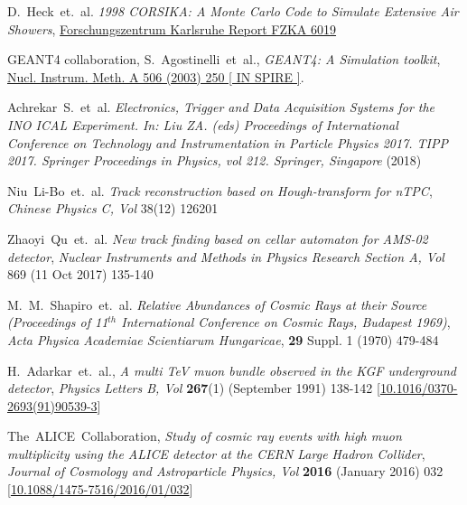 \documentclass[a4paper,12pt,twoside]{article}
\begin{document}
\begin{thebibliography}{9}
  D.~Heck~et.~al. \emph{1998 CORSIKA: A Monte Carlo Code to Simulate Extensive Air Showers}, \href{https://www.ikp.kit.edu/corsika/70.php}{Forschungszentrum Karlsruhe Report FZKA 6019}
    
  GEANT4 collaboration, S.~Agostinelli~et~al., \textit{GEANT4: A Simulation toolkit}, \href{https://doi.org/10.1016/j.nima.2010.08.075}{Nucl. Instrum.  Meth. A 506 (2003) 250 [ IN SPIRE ]}.
  


  Achrekar~S.~et~al. \emph{Electronics, Trigger and Data Acquisition Systems for the INO ICAL Experiment. In: Liu ZA. (eds) Proceedings of International Conference on Technology and Instrumentation in Particle Physics 2017. TIPP 2017. Springer Proceedings in Physics, vol 212. Springer, Singapore} (2018)

  Niu~Li-Bo~et.~al. \emph{Track reconstruction based on Hough-transform for nTPC}, \emph{Chinese Physics C, Vol} 38(12) 126201
  
  Zhaoyi~Qu~et.~al. \emph{New track finding based on cellar automaton for AMS-02 detector}, \emph{Nuclear Instruments and Methods in Physics Research Section A, Vol} 869 (11 Oct 2017) 135-140
  
  M.~M.~Shapiro~et.~al. \emph{Relative Abundances of Cosmic Rays at their Source (Proceedings of 11$^{th}$ International Conference on Cosmic Rays, Budapest 1969)}, \emph{Acta Physica Academiae Scientiarum Hungaricae}, \textbf{29} Suppl. 1 (1970) 479-484 

  H.~Adarkar~et.~al., \emph{A multi TeV muon bundle observed in the KGF underground detector}, \emph{Physics Letters B, Vol} \textbf{267}(1) (September 1991) 138-142 [\href{https://doi.org/10.1016/0370-2693(91)90539-3}{10.1016/0370-2693(91)90539-3}]

  The~ALICE~Collaboration, \emph{Study of cosmic ray events with high muon multiplicity using the ALICE detector at the CERN Large Hadron Collider}, \emph{Journal of Cosmology and Astroparticle Physics, Vol} \textbf{2016} (January 2016) 032 [\href{https://doi.org/10.1088/1475-7516/2016/01/032}{10.1088/1475-7516/2016/01/032}]


\end{thebibliography}
\end{document}
